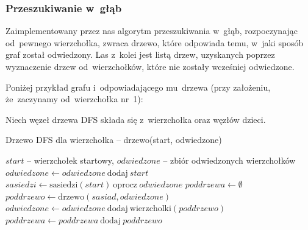 \documentclass[a4paper,12pt]{mwart}
\begin{document}
\subsubsection{Przeszukiwanie w~głąb}
\label{sec:dfs-tree}

Zaimplementowany przez nas algorytm przeszukiwania w~głąb, rozpoczynając
od~pewnego wierzchołka, zwraca drzewo, które odpowiada temu, w~jaki sposób graf
został odwiedzony. Las z~kolei jest listą drzew, uzyskanych poprzez wyznaczenie
drzew od~wierzchołków, które nie zostały wcześniej odwiedzone.

Poniżej przykład grafu i~odpowiadającego mu~drzewa (przy założeniu,
że~zaczynamy od~wierzchołka nr~1):

\begin{figure}[H]
  \centering
\end{figure}

Niech węzeł drzewa DFS składa się z~wierzchołka oraz węzłów dzieci.

\begin{algorithm}[H]
\caption{Drzewo DFS dla wierzchołka -- drzewo(start, odwiedzone)}
\begin{algorithmic}[1]
\Require $start$ -- wierzchołek startowy, $odwiedzone$ -- zbiór odwiedzonych wierzchołków
\State {}
\Else
\State $odwiedzone \gets odwiedzone \ \text{dodaj} \ start$
\State $sasiedzi \gets \text{sasiedzi}(start) \ \text{oprocz} \ odwiedzone$ \label{alg:dfs-tree:sasiedzi}
\State $poddrzewa \gets \emptyset$
\State $poddrzewo \gets \text{drzewo}(sasiad, odwiedzone)$ 
\State $odwiedzone \gets odwiedzone \ \text{dodaj} \ \text{wierzcholki}(poddrzewo)$ \label{alg:dfs-tree:wierzcholki}
\State $poddrzewa \gets poddrzewa \ \text{dodaj} \ poddrzewo$
\EndFor
\State {}
\EndIf
\end{algorithmic}
\end{algorithm}
\end{document}
